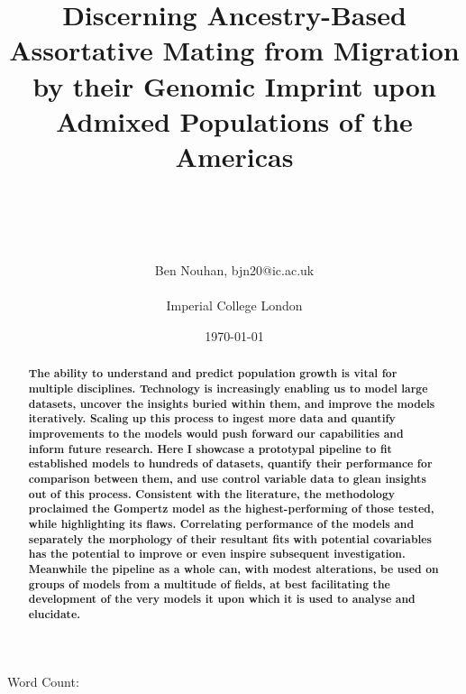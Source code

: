 \documentclass[11pt]{article}
\title{Discerning Ancestry-Based Assortative Mating from Migration by their Genomic Imprint upon Admixed Populations of the Americas}
\author{\\ \\ \\ \\ Ben Nouhan, bjn20@ic.ac.uk \\ \\ Imperial College London \\}
\date{\today}
\newcommand\wordcount{}
\begin{document}
\vspace{30mm}
\maketitle
\thispagestyle{empty}

\vspace{5mm}
\centerline{Word Count: \wordcount}

\vspace{15mm}
\onehalfspacing
\renewcommand{\abstractname}{\vspace{-\baselineskip}} %

\begin{abstract}
    \linenumbers
    \noindent
    \textbf{The ability to understand and predict population growth is vital for multiple disciplines. Technology is increasingly enabling us to model large datasets, uncover the insights buried within them, and improve the models iteratively. Scaling up this process to ingest more data and quantify improvements to the models would push forward our capabilities and inform future research. Here I showcase a prototypal pipeline to fit established models to hundreds of datasets, quantify their performance for comparison between them, and use control variable data to glean insights out of this process. Consistent with the literature, the methodology proclaimed the Gompertz model as the highest-performing of those tested, while highlighting its flaws. Correlating performance of the models and separately the morphology of their resultant fits with potential covariables has the potential to improve or even inspire subsequent investigation. Meanwhile the pipeline as a whole can, with modest alterations, be used on groups of models from a multitude of fields, at best facilitating the development of the very models it upon which it is used to analyse and elucidate.
    }
\end{abstract}
\vspace{10mm}


\newpage
\tableofcontents
\thispagestyle{empty}

\newpage
\linenumbers


\setcounter{page}{1}
\end{document}
